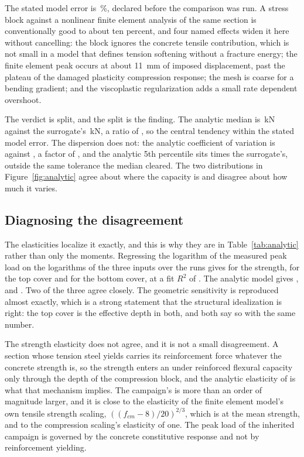 \documentclass[11pt,a4paper]{article}
\begin{document}
The stated model error is \AnalyticModelErrorPct\,\%, declared before the comparison was run.
A stress block against a nonlinear finite element analysis of the same section is conventionally
good to about ten percent, and four named effects widen it here without cancelling: the block
ignores the concrete tensile contribution, which is not small in a model that defines tension
softening without a fracture energy; the finite element peak occurs at about 11~mm
of imposed displacement, past the plateau of the damaged plasticity compression response; the
mesh is coarse for a bending gradient; and the viscoplastic regularization adds a small rate
dependent overshoot.

The verdict is split, and the split is the finding. The analytic median is
\AnalyticMedianKN\,kN against the surrogate's \SurrogateMedianKN\,kN, a ratio of
\AnalyticMedianRatio{}, so the central tendency \AnalyticCentralVerdict{} within the stated
model error. The dispersion does not: the analytic coefficient of variation is \AnalyticCoV{}
against \SurrogateCoV{}, a factor of \AnalyticDispersionRatio{}, and the analytic 5th percentile
sits \AnalyticLowerRatio{} times the surrogate's, outside the same tolerance the median cleared.
The two distributions in Figure~\ref{fig:analytic} agree about where the capacity is and disagree
about how much it varies.

\subsection{Diagnosing the disagreement}
The elasticities localize it exactly, and this is why they are in Table~\ref{tab:analytic}
rather than only the moments. Regressing the logarithm of the measured peak load on the
logarithms of the three inputs over the \NValid{} runs gives \CampaignElasticityFcm{} for the
strength, \CampaignElasticityCTop{} for the top cover and \CampaignElasticityCBot{} for the
bottom cover, at a fit $R^2$ of \CampaignElasticityRSq{}. The analytic model gives
\AnalyticElasticityFcm{}, \AnalyticElasticityCTop{} and \AnalyticElasticityCBot{}. Two of the
three agree closely. The geometric sensitivity is reproduced almost exactly, which is a strong
statement that the structural idealization is right: the top cover is the effective depth in
both, and both say so with the same number.

The strength elasticity does not agree, and it is not a small disagreement. A section whose
tension steel yields carries its reinforcement force whatever the concrete strength is, so the
strength enters an under reinforced flexural capacity only through the depth of the compression
block, and the analytic elasticity of \AnalyticElasticityFcm{} is what that mechanism implies.
The campaign's \CampaignElasticityFcm{} is more than an order of magnitude larger, and it is
close to the elasticity of the finite element model's own tensile strength scaling,
$((f_{cm} - 8)/20)^{2/3}$, which is \AnalyticTensionElasticity{} at the mean strength, and to
the compression scaling's elasticity of one. The peak load of the inherited campaign is
governed by the concrete constitutive response and not by reinforcement yielding.
\end{document}
